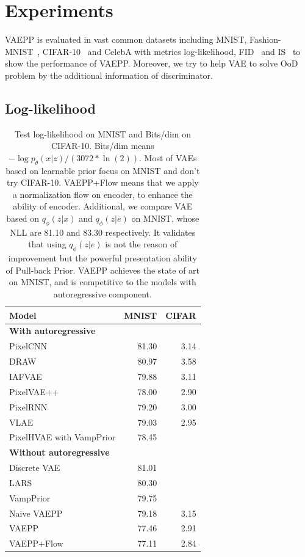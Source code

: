 \section{Experiments}
VAEPP is evaluated in vast common datasets including MNIST, Fashion-MNIST~\cite{xiao2017/online}, CIFAR-10~\cite{krizhevsky2009learning} and CelebA with metrics log-likelihood, FID~\cite{heusel2017gans} and IS~\cite{salimans2016improved} to show the performance of VAEPP. Moreover, we try to help VAE to solve OoD problem by the additional information of discriminator. 
\subsection{Log-likelihood}
\begin{table}[tb]
\centering
\begin{tabular}{lrr}  
\toprule
Model  &  MNIST & CIFAR\\
\midrule
\textbf{With autoregressive}   \\
PixelCNN         &  81.30  &  3.14   \\
DRAW             &  80.97  &  3.58    \\
IAFVAE           &  79.88  &  3.11    \\
PixelVAE++       &  78.00  &  2.90   \\
PixelRNN         &  79.20  &  3.00    \\
VLAE             &  79.03  &  2.95     \\
PixelHVAE with VampPrior &  78.45  &     \\
\midrule
\textbf{Without autoregressive}   \\
Discrete VAE     &  81.01     \\
LARS             &  80.30     \\
VampPrior        &  79.75     \\
Naive VAEPP      &  79.18 & 3.15    \\
VAEPP            &  77.46 & 2.91	    \\
VAEPP+Flow       &  77.11 & 2.84    \\
\bottomrule
\end{tabular}
\caption{Test log-likelihood on MNIST and Bits/dim on CIFAR-10. Bits/dim means $-\log p_\theta(x|z) / (3072 * \ln(2))$. Most of VAEs based on learnable prior focus on MNIST and don't try CIFAR-10. 
VAEPP+Flow means that we apply a normalization flow on encoder, to enhance the ability of encoder. 
Additional, we compare VAE based on $q_\phi(z|x)$ and $q_\phi(z|e)$ on MNIST, whose NLL are 81.10 and 83.30 respectively. It validates that using $q_\phi(z|e)$ is not the reason of improvement but the powerful presentation ability of Pull-back Prior. VAEPP achieves the state of art on MNIST, and is competitive to the models with autoregressive component. }
\label{tab:mnist-nll}
\end{table}
